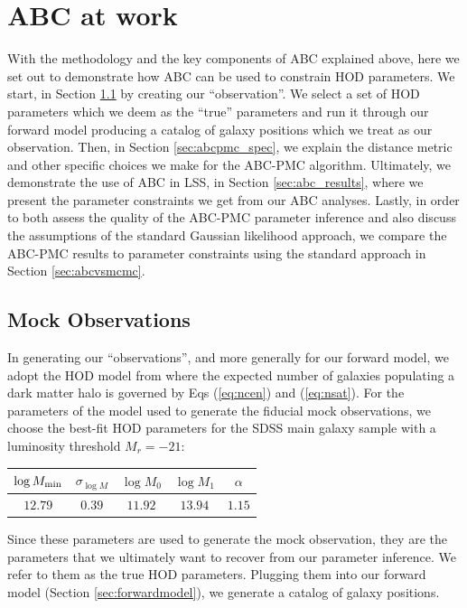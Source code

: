 \documentclass[fleqn,usenatbib]{mnras}
\begin{document}
\section{ABC at work}\label{sec:abcatwork}
With the methodology and the key components of ABC explained above, here we set out to 
demonstrate how ABC can be used to constrain HOD parameters. We start, in Section \ref{sec:mock_obv} 
by creating our ``observation''. We select a set of HOD parameters which we deem as the ``true'' 
parameters and run it through our forward model producing a catalog of galaxy positions 
which we treat as our observation. Then, in Section \ref{sec:abcpmc_spec}, we explain 
the distance metric and other specific choices we make for the ABC-PMC algorithm. 
Ultimately, we demonstrate the use of ABC in LSS, in Section \ref{sec:abc_results},
where we present the parameter constraints we get from our ABC analyses. 
Lastly, in order to both assess the quality of the ABC-PMC parameter inference and also 
discuss the assumptions of the standard Gaussian likelihood approach, we compare the 
ABC-PMC results to parameter constraints using the standard approach in Section 
\ref{sec:abcvsmcmc}.

\subsection{Mock Observations}\label{sec:mock_obv}
In generating our ``observations'', and more generally for our forward model, we adopt 
the HOD model from \cite{zheng07} where the expected number of galaxies populating a 
dark matter halo is governed by Eqs (\ref{eq:ncen}) and (\ref{eq:nsat}). For the parameters 
of the model used to generate the fiducial mock observations, we choose the \cite{zheng07} best-fit HOD parameters for the 
SDSS main galaxy sample with a luminosity threshold $M_{r} = -21$: 
\begin{center}
\renewcommand{\arraystretch}{1.5}
\begin{tabular}{ccccc} \hline \hline 
$\log M_{\rm min}$ & $\sigma_{\log M}$ & $\log M_{0}$ & $\log M_{1}$ & $\alpha$ \\ \hline
$12.79$ & $0.39$ & $11.92$ & $13.94$ & $1.15$ \\ \hline 
\end{tabular} \par
\end{center}
Since these parameters are used to generate the mock observation, they are the parameters
that we ultimately want to recover from our parameter inference. We refer to them as the
true HOD parameters. Plugging them into our forward model (Section \ref{sec:forwardmodel}), 
we generate a catalog of galaxy positions. 
\end{document}
